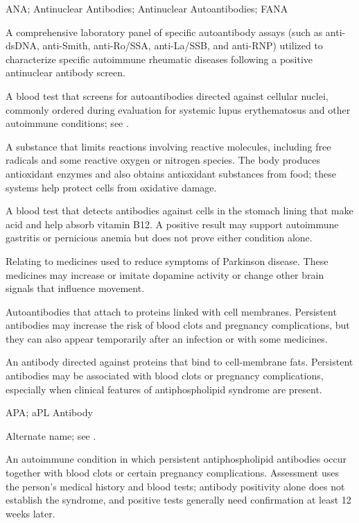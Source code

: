 \synonyms
ANA; Antinuclear Antibodies; Antinuclear Autoantibodies; FANA

 A comprehensive laboratory panel of specific autoantibody assays (such as anti-dsDNA, anti-Smith, anti-Ro/SSA, anti-La/SSB, and anti-RNP) utilized to characterize specific autoimmune rheumatic diseases following a positive antinuclear antibody screen.

 A blood test that screens for autoantibodies directed against cellular nuclei, commonly ordered during evaluation for systemic lupus erythematosus and other autoimmune conditions; see .

 A substance that limits reactions involving reactive
molecules, including free radicals and some reactive oxygen or nitrogen
species. The body produces antioxidant enzymes and also obtains antioxidant
substances from food; these systems help protect cells from oxidative damage.

 A blood test that detects antibodies against cells in the stomach lining that make acid and help absorb vitamin B12. A positive result may support autoimmune gastritis or pernicious anemia but does not prove either condition alone.

 Relating to medicines used to reduce symptoms of Parkinson disease. These medicines may increase or imitate dopamine activity or change other brain signals that influence movement.

 Autoantibodies that attach to proteins linked with cell membranes. Persistent antibodies may increase the risk of blood clots and pregnancy complications, but they can also appear temporarily after an infection or with some medicines.

 An antibody directed against proteins that bind to cell-membrane fats. Persistent antibodies may be associated with blood clots or pregnancy complications, especially when clinical features of antiphospholipid syndrome are present.

\synonyms
APA; aPL Antibody

 Alternate name; see .

 An autoimmune condition in which persistent antiphospholipid antibodies occur together with blood clots or certain pregnancy complications. Assessment uses the person’s medical history and blood tests; antibody positivity alone does not establish the syndrome, and positive tests generally need confirmation at least 12 weeks later.

